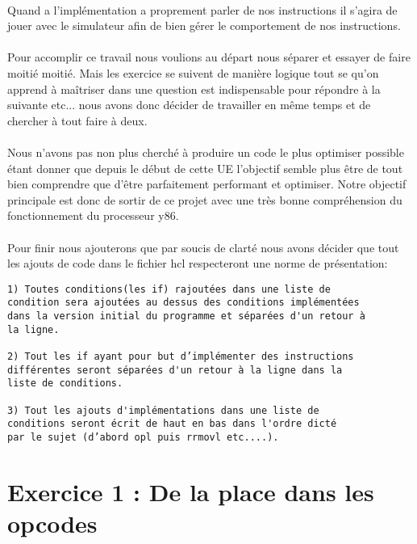 \documentclass[12pt]{article}
\begin{document}
\paragraph{} Quand a l’implémentation a proprement parler de nos instructions il
s’agira de jouer avec le simulateur afin de bien gérer le comportement de nos instructions.

\paragraph{} Pour accomplir ce travail nous voulions au départ nous séparer et essayer de faire moitié moitié. Mais les exercice se suivent de manière logique tout se qu'on apprend à maîtriser dans une question est indispensable pour répondre à la suivante etc... nous avons donc décider de travailler en même temps et de chercher à tout faire à deux.

\paragraph{} Nous n'avons pas non plus cherché à produire un code le plus optimiser possible étant donner que depuis le début de cette UE l'objectif semble plus être de tout bien comprendre que d’être parfaitement performant et optimiser. Notre objectif principale est donc de sortir de ce projet avec une très bonne compréhension du fonctionnement du processeur y86.

\paragraph{} Pour finir nous ajouterons que par soucis de clarté nous avons décider que tout les ajouts de code dans le fichier hcl respecteront une norme de présentation:
\begin{verbatim}
1) Toutes conditions(les if) rajoutées dans une liste de 
condition sera ajoutées au dessus des conditions implémentées 
dans la version initial du programme et séparées d'un retour à 
la ligne.

2) Tout les if ayant pour but d’implémenter des instructions
différentes seront séparées d'un retour à la ligne dans la 
liste de conditions.

3) Tout les ajouts d'implémentations dans une liste de 
conditions seront écrit de haut en bas dans l'ordre dicté 
par le sujet (d’abord opl puis rrmovl etc....).
\end{verbatim}
\newpage


\section{Exercice 1 : De la place dans les opcodes}
\end{document}
